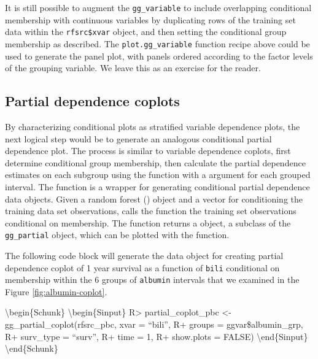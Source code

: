 \documentclass[article]{jss}
\begin{document}
It is still possible to augment the \texttt{gg\_variable} to include
overlapping conditional membership with continuous variables by
duplicating rows of the training set data within the
\texttt{rfsrc\$xvar} object, and then setting the conditional group
membership as described. The \texttt{plot.gg\_variable} function recipe
above could be used to generate the panel plot, with panels ordered
according to the factor levels of the grouping variable. We leave this
as an exercise for the reader.

\subsection{Partial dependence
coplots}\label{partial-dependence-coplots}

By characterizing conditional plots as stratified variable dependence
plots, the next logical step would be to generate an analogous
conditional partial dependence plot. The process is similar to variable
dependence coplots, first determine conditional group membership, then
calculate the partial dependence estimates on each subgroup using the
 function with a  argument for each
grouped interval. The  
function is a wrapper for generating conditional partial dependence data
objects. Given a random forest () object and a 
vector for conditioning the training data set observations,
 calls the  function the
training set observations conditional on  membership. The
function returns a  object, a subclass of the
\texttt{gg\_partial} object, which can be plotted with the
 function.

The following code block will generate the data object for creating
partial dependence coplot of 1 year survival as a function of
\texttt{bili} conditional on membership within the 6 groups of
\texttt{albumin} intervals that we examined in the Figure
\ref{fig:albumin-coplot}.

\textbackslash{}begin\{Schunk\} \textbackslash{}begin\{Sinput\}
R\textgreater{} partial\_coplot\_pbc \textless{}-
gg\_partial\_coplot(rfsrc\_pbc, xvar = ``bili'', R+ groups =
ggvar\$albumin\_grp, R+ surv\_type = ``surv'', R+ time = 1, R+
show.plots = FALSE) \textbackslash{}end\{Sinput\}
\textbackslash{}end\{Schunk\}
\end{document}
